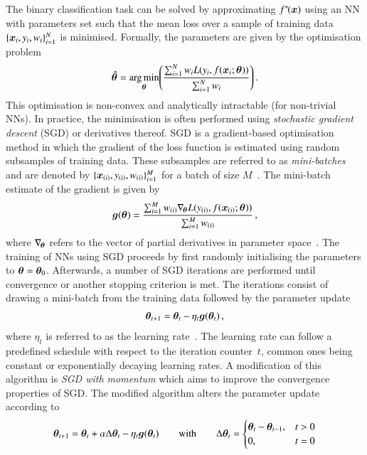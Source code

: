 The binary classification task can be solved by approximating
$f^{*\!}(\bm{x})$ using an NN with parameters set such that the mean loss
over a sample of training data~$\{\bm{x}_i, y_i, w_i\}_{i = 1}^N$ is
minimised. Formally, the parameters are given by the optimisation problem
\begin{align*}
  \bm{\hat{\theta}} =
  \operatorname*{arg\,min}_{\bm{\theta}}\mathopen{}\left(
  \frac{\sum_{i = 1}^{N} w_i L(y_i, f(\bm{x}_i; \bm{\theta}))}{\sum_{i = 1}^{N} w_i}
  \right)\mathclose{}
  \,\text{.}
\end{align*}
This optimisation is non-convex and analytically intractable (for non-trivial
NNs). In practice, the minimisation is often performed using \emph{stochastic
  gradient descent} (SGD) or derivatives thereof. SGD is a gradient-based
optimisation method in which the gradient of the loss function is estimated
using random subsamples of training data. These subsamples are referred to as
\emph{mini-batches} and are denoted by
$\{\bm{x}_{(i)}, y_{(i)}, w_{(i)}\}_{i=1}^{M}$ for a batch of size
$M$~\cite{Goodfellow-et-al-2016}. The mini-batch estimate of the gradient is
given by
\begin{align*}
  \bm{g}(\bm{\theta})
  = \frac{
  \sum_{i=1}^{M} w_{(i)}  \nabla_{\!\bm{\theta}} L(y_{(i)}, f(\bm{x}_{(i)}; \bm{\theta}))
  }{
  \sum_{i=1}^{M} w_{(i)}
  } \,\text{,}
\end{align*}
where $\nabla_{\!\bm{\theta}}$ refers to the vector of partial derivatives in
parameter space~\cite{Goodfellow-et-al-2016}. The training of NNs using SGD
proceeds by first randomly initialising the parameters to
$\bm{\theta} = \bm{\theta}_0$. Afterwards, a number of SGD iterations are
performed until convergence or another stopping criterion is met. The iterations
consist of drawing a mini-batch from the training data followed by the parameter
update
\begin{align*}
  \bm{\theta}_{t + 1} = \bm{\theta}_{t} - \eta_{t} \bm{g}(\bm{\theta}_{t}) \,\text{,}
\end{align*}
where $\eta_{t}$ is referred to as the learning
rate~\cite{Goodfellow-et-al-2016}. The learning rate can follow a predefined
schedule with respect to the iteration counter~$t$, common ones being constant
or exponentially decaying learning rates. A modification of this algorithm is
\emph{SGD with momentum} which aims to improve the convergence properties of
SGD. The modified algorithm alters the parameter update according to
\begin{align*}
  \bm{\theta}_{t + 1} = \bm{\theta}_{t}
  + \alpha \Delta\bm{\theta}_{t} - \eta_t \bm{g}(\bm{\theta}_{t})
  \qquad \text{with} \qquad
  \Delta\bm{\theta}_{t} =
  \begin{cases}
    \bm{\theta}_{t} - \bm{\theta}_{t - 1}, & t > 0 \\
    0,                                         & t = 0
  \end{cases}
\end{align*}
